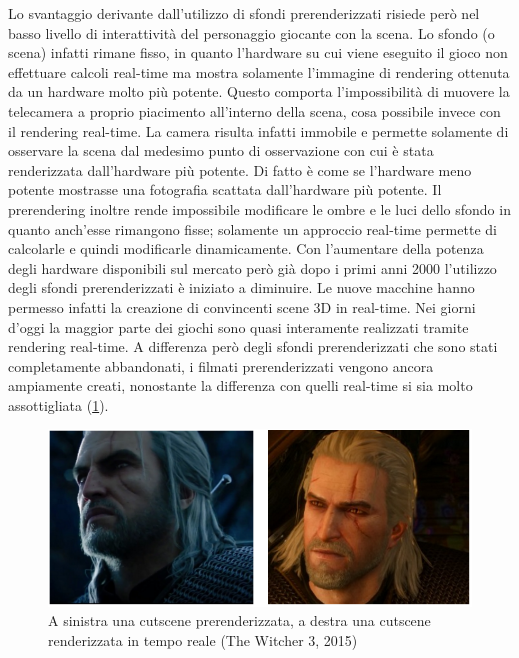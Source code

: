 Lo svantaggio derivante dall’utilizzo di sfondi prerenderizzati risiede però nel basso livello di interattività del personaggio giocante con la scena. 
Lo sfondo (o scena) infatti rimane fisso, in quanto l’hardware su cui viene eseguito il gioco non effettuare calcoli real-time ma mostra solamente l’immagine di rendering ottenuta da un hardware molto più potente. 
Questo comporta l’impossibilità di muovere la telecamera a proprio piacimento all’interno della scena, cosa possibile invece con il rendering real-time. La camera risulta infatti immobile e permette solamente di osservare la scena dal medesimo punto di osservazione con cui è stata renderizzata dall’hardware più potente. Di fatto è come se l’hardware meno potente mostrasse una fotografia scattata dall’hardware più potente.
Il prerendering inoltre rende impossibile modificare le ombre e le luci dello sfondo in quanto anch’esse rimangono fisse; solamente un approccio real-time permette di calcolarle e quindi modificarle dinamicamente.
Con l’aumentare della potenza degli hardware disponibili sul mercato però già dopo i primi anni 2000 l’utilizzo degli sfondi prerenderizzati è iniziato a diminuire. Le nuove macchine hanno permesso infatti la creazione di convincenti scene 3D in real-time. 
Nei giorni d’oggi la maggior parte dei giochi sono quasi interamente realizzati tramite rendering real-time. A differenza però degli sfondi prerenderizzati che sono stati completamente abbandonati, i filmati prerenderizzati vengono ancora ampiamente creati, nonostante la differenza con quelli real-time si sia molto assottigliata (\ref{fig:stato_arte_cutscenes}).
\\
\begin{figure}[htb]
 \centering
 \includegraphics[width=1\linewidth]{images/chapter_stato_arte/stato_arte_tw.png}\hfill
 \caption[Confronto tra cutscene moderne prerenderizzate e real time]{A sinistra una cutscene prerenderizzata, a destra una cutscene renderizzata in tempo reale (The Witcher 3,  2015)}
 \label{fig:stato_arte_cutscenes}
\end{figure}

